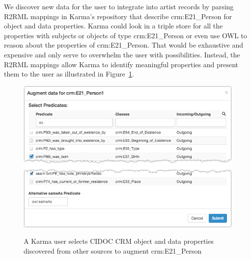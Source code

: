 We discover new data for the user to integrate into artist records by parsing R2RML mappings in Karma's repository that describe crm:E21\_Person for object and data properties.
Karma could look in a triple store for all the properties with subjects or objects of type crm:E21\_Person or even use OWL to reason about the properties of crm:E21\_Person.
That would be exhaustive and expensive and only serve to overwhelm the user with possibilities.
Instead, the R2RML mappings allow Karma to identify meaningful properties and present them to the user as illustrated in Figure~\ref{fig:search-screenshot}.
\begin{figure}
\begin{center}
\includegraphics[width=4.9in]{images/5-search.png}
\vspace{-3mm}
\caption{A Karma user selects CIDOC CRM object and data properties discovered from other sources to augment crm:E21\_Person}
\vspace{-2mm}
\label{fig:search-screenshot}
\end{center}
\vspace{-1.5em}
\end{figure}